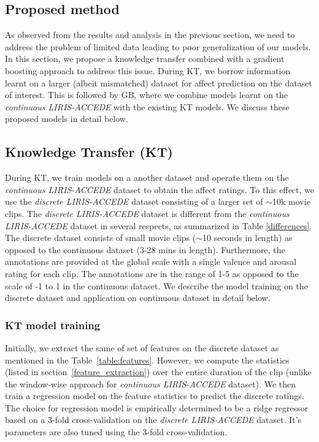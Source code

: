 \documentclass{article}
\begin{document}
\subsection{Proposed method}
As observed from the results and analysis in the previous section, we need to address the problem of limited data leading to poor generalization of our models.
In this section, we propose a knowledge transfer combined with a gradient boosting approach to address this issue.
During KT, we borrow information learnt on a larger (albeit mismatched) dataset for affect prediction on the dataset of interest.
This is followed by GB, where we combine models learnt on the {\it continuous LIRIS-ACCEDE} with the existing KT models.
We discuss these proposed models in detail below. 

\subsection{Knowledge Transfer (KT)}
During KT, we train models on a another dataset and operate them on the {\it continuous LIRIS-ACCEDE} dataset to obtain the affect ratings.
To this effect, we use the {\it discrete LIRIS-ACCEDE} dataset consisting of a larger set of $\sim$10k movie clips.  
The {\it discrete LIRIS-ACCEDE} dataset is different from the {\it continuous LIRIS-ACCEDE} dataset in several respects, as summarized in Table \ref{differences}.
The discrete dataset consists of small movie clips ($\sim$10 seconds in length) as opposed to the continuous dataset (3-28 mins in length).
Furthermore, the annotations are provided at the global scale with a single valence and arousal rating for each clip.
The annotations are in the range of 1-5 as opposed to the scale of -1 to 1 in the continuous dataset. 
We describe the model training on the discrete dataset and application on continuous dataset in detail below.

\subsubsection{KT model training}
Initially, we extract the same of set of features on the discrete dataset as mentioned in the Table~\ref{table:features}.
However, we compute the statistics (listed in section~\ref{feature_extraction}) over the entire duration of the clip (unlike the window-wise approach for {\it continuous LIRIS-ACCEDE} dataset).
We then train a regression model on the feature statistics to predict the discrete ratings.
The choice for regression model is empirically determined to be a ridge regressor based on a 3-fold cross-validation on the {\it discrete LIRIS-ACCEDE} dataset. It's parameters are also tuned using the 3-fold cross-validation. 
\end{document}
